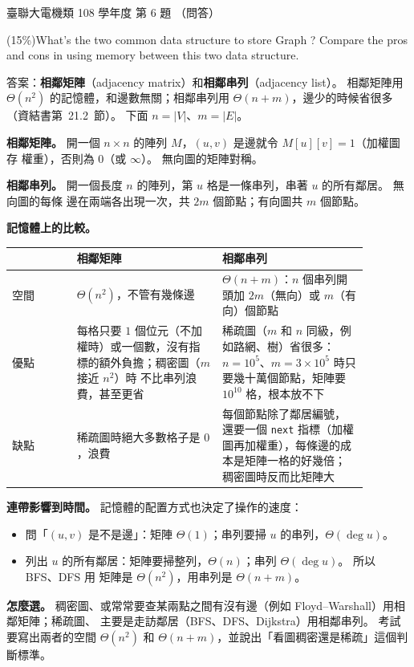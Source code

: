 \begin{pastexam}[label={px:ust-108-ee-ds-06}]{臺聯大電機類 108 學年度 第 6 題}
（問答）

(15\%)What's the two common data structure to store Graph ? Compare the pros and cons in using memory
between this two data structure.
\end{pastexam}

\begin{pastsoln}
答案：\textbf{相鄰矩陣}（adjacency matrix）和\textbf{相鄰串列}（adjacency list）。 相鄰矩陣用
$\Theta(n^2)$ 的記憶體，和邊數無關；相鄰串列用 $\Theta(n + m)$，邊少的時候省很多（資結書第~21.2~節）。
下面 $n = |V|$、$m = |E|$。

\textbf{相鄰矩陣。} 開一個 $n \times n$ 的陣列 $M$，$(u, v)$ 是邊就令 $M[u][v] = 1$（加權圖存
權重），否則為 $0$（或 $\infty$）。 無向圖的矩陣對稱。

\textbf{相鄰串列。} 開一個長度 $n$ 的陣列，第 $u$ 格是一條串列，串著 $u$ 的所有鄰居。 無向圖的每條
邊在兩端各出現一次，共 $2m$ 個節點；有向圖共 $m$ 個節點。

\textbf{記憶體上的比較。}
\begin{center}
\begin{tabular}{p{0.16\linewidth}p{0.36\linewidth}p{0.36\linewidth}}
\toprule
& 相鄰矩陣 & 相鄰串列 \\
\midrule
空間 & $\Theta(n^2)$，不管有幾條邊 & $\Theta(n + m)$：$n$ 個串列開頭加 $2m$（無向）或 $m$（有向）個節點 \\
優點 & 每格只要 $1$ 個位元（不加權時）或一個數，沒有指標的額外負擔；稠密圖（$m$ 接近 $n^2$）時
不比串列浪費，甚至更省 & 稀疏圖（$m$ 和 $n$ 同級，例如路網、樹）省很多：$n = 10^5$、$m = 3 \times 10^5$
時只要幾十萬個節點，矩陣要 $10^{10}$ 格，根本放不下 \\
缺點 & 稀疏圖時絕大多數格子是 $0$，浪費 & 每個節點除了鄰居編號，還要一個 \texttt{next} 指標（加權
圖再加權重），每條邊的成本是矩陣一格的好幾倍；稠密圖時反而比矩陣大 \\
\bottomrule
\end{tabular}
\end{center}

\textbf{連帶影響到時間。} 記憶體的配置方式也決定了操作的速度：
\begin{itemize}
\item 問「$(u, v)$ 是不是邊」：矩陣 $\Theta(1)$；串列要掃 $u$ 的串列，$\Theta(\deg u)$。
\item 列出 $u$ 的所有鄰居：矩陣要掃整列，$\Theta(n)$；串列 $\Theta(\deg u)$。 所以 BFS、DFS 用
矩陣是 $\Theta(n^2)$，用串列是 $\Theta(n + m)$。
\end{itemize}

\textbf{怎麼選。} 稠密圖、或常常要查某兩點之間有沒有邊（例如 Floyd--Warshall）用相鄰矩陣；稀疏圖、
主要是走訪鄰居（BFS、DFS、Dijkstra）用相鄰串列。 考試要寫出兩者的空間 $\Theta(n^2)$ 和
$\Theta(n + m)$，並說出「看圖稠密還是稀疏」這個判斷標準。
\end{pastsoln}
